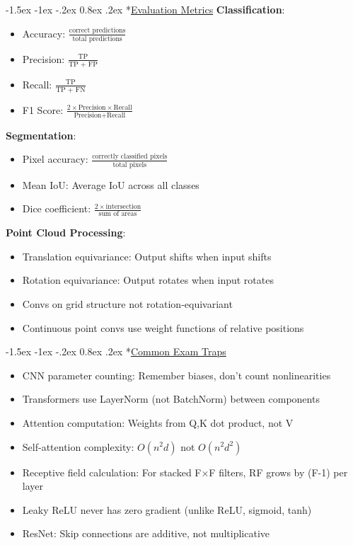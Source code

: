 \documentclass{article}
\makeatletter
\renewcommand\section{\@startsection{section}{1}{\z@}%
                                  {-1.5ex \@plus -1ex \@minus -.2ex}%
                                  {0.8ex \@plus.2ex}%
                                  {\normalfont\small\bfseries}}
\makeatother
\begin{document}
\begin{multicols}{3}
\section*{\underline{Evaluation Metrics}}
\textbf{Classification}:
\begin{itemize}
\item Accuracy: $\frac{\text{correct predictions}}{\text{total predictions}}$
\item Precision: $\frac{\text{TP}}{\text{TP + FP}}$
\item Recall: $\frac{\text{TP}}{\text{TP + FN}}$
\item F1 Score: $\frac{2 \times \text{Precision} \times \text{Recall}}{\text{Precision} + \text{Recall}}$
\end{itemize}

\textbf{Segmentation}:
\begin{itemize}
\item Pixel accuracy: $\frac{\text{correctly classified pixels}}{\text{total pixels}}$
\item Mean IoU: Average IoU across all classes
\item Dice coefficient: $\frac{2 \times \text{intersection}}{\text{sum of areas}}$
\end{itemize}

\textbf{Point Cloud Processing}:
\begin{itemize}
\item Translation equivariance: Output shifts when input shifts
\item Rotation equivariance: Output rotates when input rotates 
\item Convs on grid structure not rotation-equivariant
\item Continuous point convs use weight functions of relative positions
\end{itemize}

\section*{\underline{Common Exam Traps}}
\begin{itemize}
\item CNN parameter counting: Remember biases, don't count nonlinearities
\item Transformers use LayerNorm (not BatchNorm) between components
\item Attention computation: Weights from Q,K dot product, not V
\item Self-attention complexity: $O(n^2d)$ not $O(n^2d^2)$
\item Receptive field calculation: For stacked F×F filters, RF grows by (F-1) per layer
\item Leaky ReLU never has zero gradient (unlike ReLU, sigmoid, tanh)
\item ResNet: Skip connections are additive, not multiplicative
\end{itemize}
\end{multicols}
\end{document}

